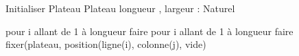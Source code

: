 \begin{algorithme}
	\small
	\fonction
	{Initialiser Plateau}
	{}
	{Plateau}
	{longueur , largeur : Naturel}
	{
	pour i allant de 1 à longueur faire
		pour i allant de 1 à longueur faire
		fixer(plateau, position(ligne(i), colonne(j), vide)
		
	}
\end{algorithme}